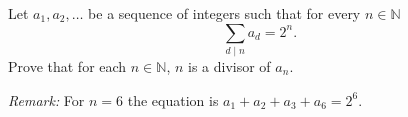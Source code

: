 Let $a_1, a_2, \ldots$ be a sequence of integers such that for every $n \in \mathbb{N}$
\[
    \sum_{d\mid n}a_d = 2^n.
\]
Prove that for each $n \in \mathbb{N}$, $n$ is a divisor of $a_n$.

\emph{Remark:} For $n=6$ the equation is $a_1+a_2+a_3+a_6=2^6$.
